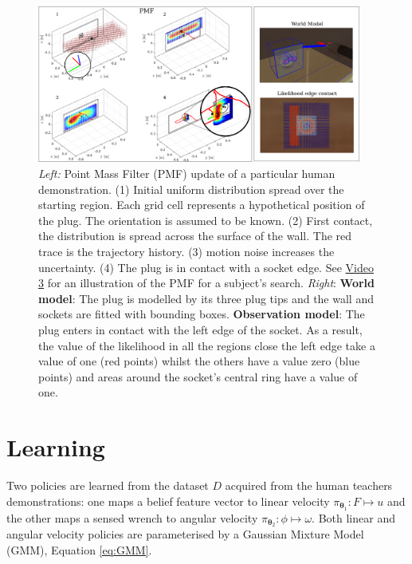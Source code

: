 \documentclass[final,5p,times,twocolumn]{elsarticle}
\newcommand{\Param}{\boldsymbol{\theta}}
\begin{document}
\begin{figure}
 \centering
   \includegraphics[width=0.95\textwidth]{./Figure/Figure2.pdf}
   \caption{\textit{Left:} Point Mass Filter (PMF) update of a particular human demonstration. (1) Initial uniform distribution spread over the starting 
   region. Each grid cell represents a hypothetical position of the plug. The orientation is assumed to be known. (2) First contact, the distribution 
   is spread across the surface of the wall. The red trace is the trajectory history. (3) motion noise increases the uncertainty. (4) The plug is in contact with a socket edge.
   See \href{http://lasa.epfl.ch/videos/gpldecha/pih-search/subject_PMF_belief_location.wmv}{Video 3} for an illustration of the PMF for a subject's search.
   \textit{Right}: \textbf{World model}: The plug is modelled by its three plug tips and the wall and sockets are fitted with bounding boxes.
   \textbf{Observation model}: The plug enters in contact with the left edge of the socket. As a result, the value of the likelihood in all the regions close the left edge take 
   a value of one (red points)  whilst the others have a value zero (blue points) and areas around the socket's central 
   ring have a value of one. }
  \label{fig:PMF}
\end{figure}




\section{Learning}\label{sec:learning-value-actor}

Two policies are learned from the dataset $D$ acquired from the human teachers demonstrations: 
one maps a belief feature vector to linear velocity $\pi_{\Param_1} : F \mapsto u$ and the other maps a sensed wrench to angular 
velocity $ \pi_{\Param_2} : \phi \mapsto \omega$.  Both linear and angular velocity policies are 
parameterised by a Gaussian Mixture Model (GMM), Equation \ref{eq:GMM}.
\end{document}
